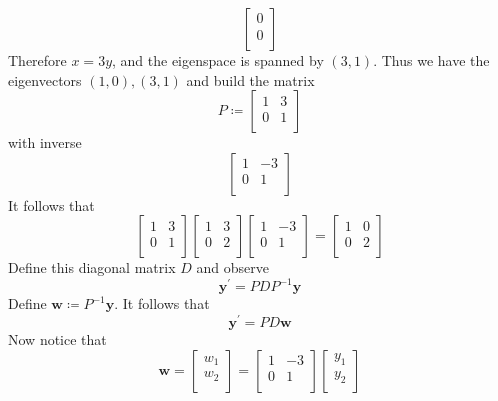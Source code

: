 \begin{longsolution}
\[\begin{bmatrix}
         0 \\
         0 \\
    \end{bmatrix}
\]
Therefore \(x=3y\), and the eigenspace is spanned by \((3,1)\). Thus we have the eigenvectors \((1,0),(3,1)\) and build the matrix
\[
    P\coloneqq \begin{bmatrix}
        1 &3   \\
        0 &1   \\
    \end{bmatrix}
\]
with inverse
\[
    \begin{bmatrix}
        1 &-3   \\
         0&  1 \\
    \end{bmatrix}
\]
It follows that
\[
    \begin{bmatrix}
        1 &3   \\
        0 &1   \\
    \end{bmatrix} \begin{bmatrix}
        1 &3   \\
         0&2   \\
    \end{bmatrix} \begin{bmatrix}
        1 &-3   \\
        0 &1   \\
    \end{bmatrix}= \begin{bmatrix}
        1 &0   \\
         0&2   \\
    \end{bmatrix}
\]
Define this diagonal matrix \(D\) and observe
\[
    \mathbf{y}^{\prime} =PDP ^{-1} \mathbf{y} 
\]
Define \(\mathbf{w} \coloneqq P ^{-1} \mathbf{y} \). It follows that
\[
    \mathbf{y} ^{\prime} =PD \mathbf{w}
\]
Now notice that
\[
    \mathbf{w} = \begin{bmatrix}
         w_1 \\
         w_2 \\
    \end{bmatrix}= \begin{bmatrix}
        1 &-3   \\
         0&1   \\
    \end{bmatrix} \begin{bmatrix}
         y_1 \\
          y_2\\

\end{bmatrix}\]
\end{longsolution}
